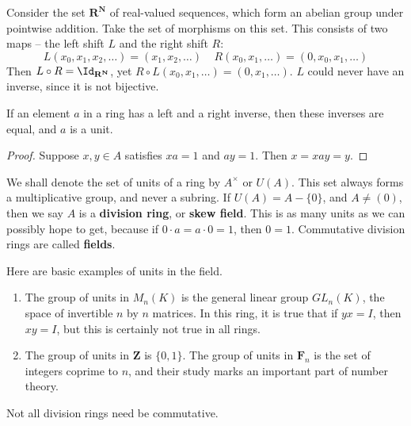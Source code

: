 \begin{example}
    Consider the set $\mathbf{R}^\mathbf{N}$ of real-valued sequences, which form an abelian group under pointwise addition. Take the set of morphisms on this set. This consists of two maps -- the left shift $L$ and the right shift $R$:
    \[ L(x_0, x_1, x_2, \dots) = (x_1, x_2, \dots)\ \ \ \ \ R(x_0, x_1, \dots) = (0, x_0, x_1, \dots) \]
    Then $L \circ R = \Id_{\mathbf{R}^\mathbf{N}}$, yet $R \circ L(x_0, x_1, \dots) = (0, x_1, \dots)$. $L$ could never have an inverse, since it is not bijective.
\end{example}

\begin{theorem}
    If an element $a$ in a ring has a left and a right inverse, then these inverses are equal, and $a$ is a unit.
\end{theorem}
\begin{proof}
    Suppose $x,y \in A$ satisfies $xa = 1$ and $ay = 1$. Then $x = xay = y$.
\end{proof}

We shall denote the set of units of a ring by $A^\times$ or $U(A)$. This set always forms a multiplicative group, and never a subring. If $U(A) = A - \{ 0 \}$, and $A \neq (0)$, then we say $A$ is a {\bf division ring}, or {\bf skew field}. This is as many units as we can possibly hope to get, because if $0 \cdot a = a \cdot 0 = 1$, then $0 = 1$. Commutative division rings are called {\bf fields}.

\begin{example}
    Here are basic examples of units in the field.
    \begin{enumerate}
        \item The group of units in $M_n(K)$ is the general linear group $GL_n(K)$, the space of invertible $n$ by $n$ matrices. In this ring, it is true that if $yx = I$, then $xy = I$, but this is certainly not true in all rings.

        \item The group of units in $\mathbf{Z}$ is $\{ 0,1 \}$. The group of units in $\mathbf{F}_n$ is the set of integers coprime to $n$, and their study marks an important part of number theory.
    \end{enumerate}
\end{example}

Not all division rings need be commutative.

